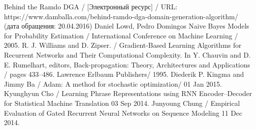 \begin{thebibliography}{00}
    Behind the Ramdo DGA /
    [Электронный ресурс] /
    URL: https://www.damballa.com/behind-ramdo-dga-domain-generation-algorithm/
    (дата обращения: 20.04.2016)
    Daniel Lowd, Pedro Domingos
    Naive Bayes Models for Probability Estimation /
    International Conference on Machine Learning /
    2005.
    R. J. Williams and D. Zipser. /
    Gradient-Based Learning Algorithms for Recurrent Networks and Their Computational Complexity. In Y. Chauvin and D. E. Rumelhart, editors, Back-propagation: Theory, Architectures and Applications /
    pages 433–486. Lawrence Erlbaum Publishers/
    1995.
    Diederik P. Kingma and Jimmy Ba /
    Adam: A method for stochastic optimization/
    01 Jan 2015.
    Kyunghyun Cho /
    Learning Phrase Representations using RNN Encoder–Decoder for Statistical Machine Translation
    03 Sep 2014.
    Junyoung Chung /
    Empirical Evaluation of Gated Recurrent Neural Networks on Sequence Modeling
    11 Dec 2014.
\end{thebibliography}
\endgroup

\clearpage
